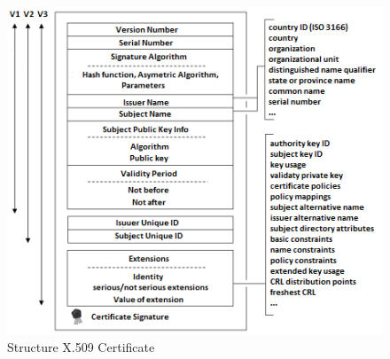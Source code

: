 \documentclass[
  twoside, 12pt, 
  printed, %
  notable,   %
  lof,     %
  lot,     %
]{fithesis3}
\begin{document}

\begin{figure}[th]
	\centering
	\includegraphics[width=1.05\textwidth]{certificate}
	\caption{Structure X.509 Certificate}
	\label{fig:certificate}
\end{figure}
\end{document}
